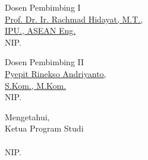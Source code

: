 \begin{center}
    \noindent
    \begin{minipage}[t]{0.48\textwidth}
        \centering
        Dosen Pembimbing I\\[1.6cm]
        \underline{Prof. Dr. Ir. Rachmad Hidayat, M.T.,}\\
        \underline{IPU., ASEAN Eng.}\\[2pt]
        NIP. \skripsiNIKPembimbingSatu
    \end{minipage}\hfill
    \begin{minipage}[t]{0.48\textwidth}
        \centering
        Dosen Pembimbing II\\[1.6cm]
        \underline{Pyepit Rinekso Andriyanto,}\\
        \underline{S.Kom., M.Kom.}\\[2pt]
        NIP. \skripsiNIKPembimbingDua
    \end{minipage}
    
    \vspace{0.95cm}
    
    Mengetahui,\\
    Ketua Program Studi\\[1.6cm]
    \underline{\skripsiKaprodi}\\[2pt]
    NIP. \skripsiNIKKaprodi

\end{center}
